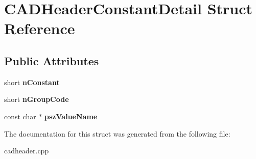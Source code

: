\hypertarget{struct_c_a_d_header_constant_detail}{}\section{C\+A\+D\+Header\+Constant\+Detail Struct Reference}
\label{struct_c_a_d_header_constant_detail}
\subsection*{Public Attributes}
\begin{DoxyCompactItemize}
\item 
short {\bfseries n\+Constant}\hypertarget{struct_c_a_d_header_constant_detail_ae6d4b24d6b9edf6c910ba33f4058781f}{}\label{struct_c_a_d_header_constant_detail_ae6d4b24d6b9edf6c910ba33f4058781f}

\item 
short {\bfseries n\+Group\+Code}\hypertarget{struct_c_a_d_header_constant_detail_aa34ab09b990a5985719d87d324295b70}{}\label{struct_c_a_d_header_constant_detail_aa34ab09b990a5985719d87d324295b70}

\item 
const char $\ast$ {\bfseries psz\+Value\+Name}\hypertarget{struct_c_a_d_header_constant_detail_a9070071da4e5e87ed07c30973338b6f1}{}\label{struct_c_a_d_header_constant_detail_a9070071da4e5e87ed07c30973338b6f1}

\end{DoxyCompactItemize}


The documentation for this struct was generated from the following file\+:\begin{DoxyCompactItemize}
\item 
cadheader.\+cpp\end{DoxyCompactItemize}
